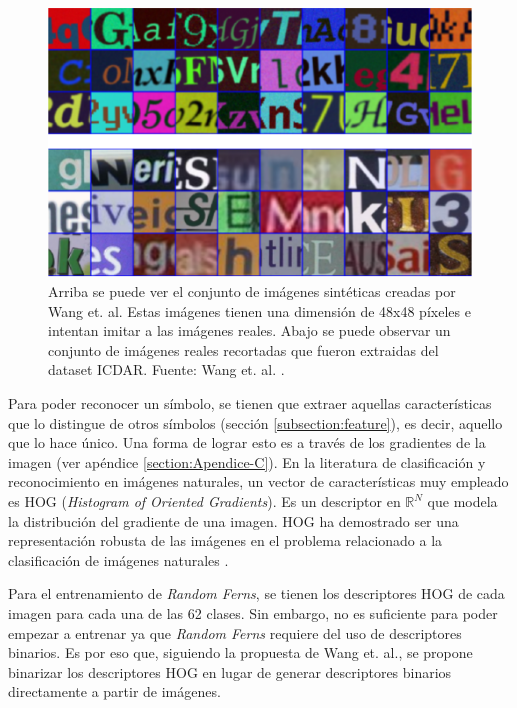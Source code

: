 		\begin{figure}[htbp]
			\centering
			\includegraphics[scale=0.5]{img/synth_data_wang.png}
			\caption[Datos sintéticos Wang]{Arriba se puede ver el conjunto de imágenes sintéticas creadas por Wang et. al. Estas imágenes tienen una dimensión de 48x48 píxeles e intentan imitar a las imágenes reales. Abajo se puede observar un conjunto de imágenes reales recortadas que  fueron extraidas del dataset ICDAR. Fuente: Wang et. al. \cite{wang}.}
			\label{fig: Datos sinteticos Wang}
		\end{figure}
	
	Para poder reconocer un símbolo, se tienen que extraer aquellas características que lo distingue de otros símbolos (sección \ref{subsection:feature}), es decir, aquello que lo hace único. Una forma de lograr esto es a través de los gradientes de la imagen (ver apéndice \ref{section:Apendice-C}). En la literatura de clasificación y reconocimiento en imágenes naturales, un vector de características muy empleado es HOG (\textit{Histogram of Oriented Gradients}). Es un descriptor en $\mathbb{R}^N$ que modela la distribución del gradiente de una imagen. HOG ha demostrado ser una representación robusta de las imágenes en el problema relacionado a la clasificación de imágenes naturales \cite{DT05}. 
	
	Para el entrenamiento de \textit{Random Ferns}, se tienen los descriptores HOG de cada imagen para cada una de las 62 clases. Sin embargo, no es suficiente para poder empezar a entrenar ya que \textit{Random Ferns} requiere del uso de descriptores binarios. Es por eso que, siguiendo la propuesta de Wang et. al., se propone binarizar los descriptores HOG en lugar de generar descriptores binarios directamente a partir de imágenes.
	
